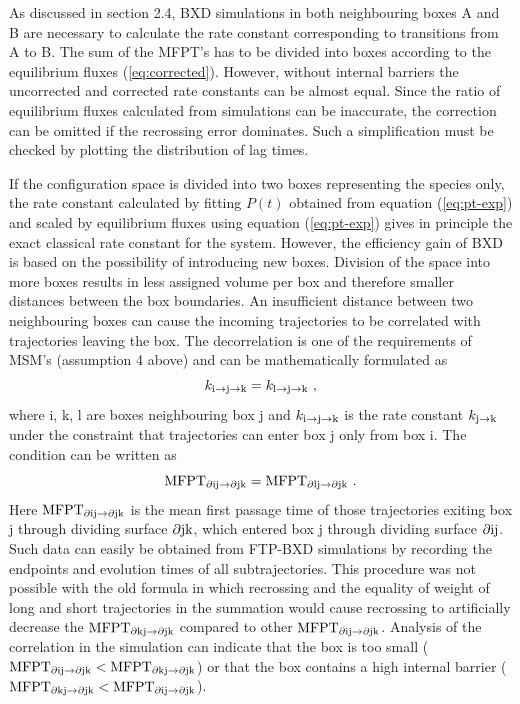 As discussed in section 2.4, BXD simulations in both neighbouring boxes A and B are necessary to calculate the rate constant corresponding to transitions from A to B.
The sum of the MFPT's has to be divided into boxes according to the equilibrium fluxes (\ref{eq:corrected}).
However, without internal barriers the uncorrected and corrected rate constants can be almost equal.
Since the ratio of equilibrium fluxes calculated from simulations can be inaccurate, the correction can be omitted if the recrossing error dominates.
Such a simplification must be checked by plotting the distribution of lag times.


If the configuration space is divided into two boxes representing the species only, the rate constant calculated by fitting $P(t)$ obtained from equation (\ref{eq:pt-exp}) and scaled by equilibrium fluxes using equation (\ref{eq:pt-exp}) gives in principle the exact classical rate constant for the system.
However, the efficiency gain of BXD is based on the possibility of introducing new boxes.
Division of the space into more boxes results in less assigned volume per box and therefore smaller distances between the box boundaries.
An insufficient distance between two neighbouring boxes can cause the incoming trajectories to be correlated with trajectories leaving the box.
The decorrelation is one of the requirements of MSM's (assumption 4 above) and can be mathematically formulated as
\begin{equation}
\label{eq:decorrelation}
k_{\rm i \rightarrow j \rightarrow k} = k_{\rm l \rightarrow j \rightarrow k} ~,
\end{equation}
where i, k, l are boxes neighbouring box j and $k_{\rm i \rightarrow j \rightarrow k}$ is the rate constant $k_{\rm j \rightarrow k}$ under the constraint that trajectories can enter box j  only from box i.
The condition can be written as
\begin{equation}
\label{eq:decorr-mfpt}
{\rm MFPT}_{\rm \partial ij \rightarrow \partial jk} = {\rm MFPT}_{\rm \partial lj \rightarrow \partial jk} ~.
\end{equation}
Here ${\rm MFPT}_{\rm \partial ij \rightarrow \partial jk}$ is the mean first passage time of those trajectories exiting box j through dividing surface ${\rm \partial jk}$, which entered box j through dividing surface ${\rm \partial ij}$.
Such data can easily be obtained from FTP-BXD simulations by recording the endpoints and evolution times of all subtrajectories.
This procedure was not possible with the old formula in which recrossing and the equality of weight of long and short trajectories in the summation would cause recrossing to artificially decrease the ${\rm MFPT}_{\rm \partial kj \rightarrow \partial jk}$ compared to other ${\rm MFPT}_{\rm \partial ij \rightarrow \partial jk}$.
Analysis of the correlation in the simulation can indicate that the box is too small (${\rm MFPT}_{\rm \partial ij \rightarrow \partial jk} < {\rm MFPT}_{\rm \partial kj \rightarrow \partial jk}$) or that the box contains a high internal barrier (${\rm MFPT}_{\rm \partial kj \rightarrow \partial jk} < {\rm MFPT}_{\rm \partial ij \rightarrow \partial jk}$).

